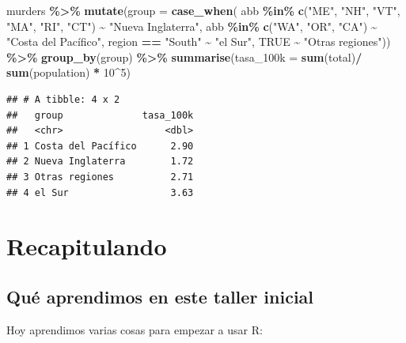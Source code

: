 \documentclass[
]{article}
\newenvironment{Shaded}{\begin{snugshade}}{\end{snugshade}}
\newcommand{\AttributeTok}[1]{\textcolor[rgb]{0.13,0.29,0.53}{#1}}
\newcommand{\ConstantTok}[1]{\textcolor[rgb]{0.56,0.35,0.01}{#1}}
\newcommand{\DecValTok}[1]{\textcolor[rgb]{0.00,0.00,0.81}{#1}}
\newcommand{\FunctionTok}[1]{\textcolor[rgb]{0.13,0.29,0.53}{\textbf{#1}}}
\newcommand{\NormalTok}[1]{#1}
\newcommand{\SpecialCharTok}[1]{\textcolor[rgb]{0.81,0.36,0.00}{\textbf{#1}}}
\newcommand{\StringTok}[1]{\textcolor[rgb]{0.31,0.60,0.02}{#1}}
\begin{document}
\begin{Shaded}
\begin{Highlighting}[]
\NormalTok{murders }\SpecialCharTok{\%\textgreater{}\%}
  \FunctionTok{mutate}\NormalTok{(}\AttributeTok{group =} \FunctionTok{case\_when}\NormalTok{(}
\NormalTok{    abb }\SpecialCharTok{\%in\%} \FunctionTok{c}\NormalTok{(}\StringTok{"ME"}\NormalTok{, }\StringTok{"NH"}\NormalTok{, }\StringTok{"VT"}\NormalTok{, }\StringTok{"MA"}\NormalTok{, }\StringTok{"RI"}\NormalTok{, }\StringTok{"CT"}\NormalTok{) }\SpecialCharTok{\textasciitilde{}} \StringTok{"Nueva Inglaterra"}\NormalTok{,}
\NormalTok{    abb }\SpecialCharTok{\%in\%} \FunctionTok{c}\NormalTok{(}\StringTok{"WA"}\NormalTok{, }\StringTok{"OR"}\NormalTok{, }\StringTok{"CA"}\NormalTok{) }\SpecialCharTok{\textasciitilde{}} \StringTok{"Costa del Pacífico"}\NormalTok{,}
\NormalTok{    region }\SpecialCharTok{==} \StringTok{"South"} \SpecialCharTok{\textasciitilde{}} \StringTok{"el Sur"}\NormalTok{,}
    \ConstantTok{TRUE} \SpecialCharTok{\textasciitilde{}} \StringTok{"Otras regiones"}\NormalTok{)) }\SpecialCharTok{\%\textgreater{}\%}
  \FunctionTok{group\_by}\NormalTok{(group) }\SpecialCharTok{\%\textgreater{}\%}
  \FunctionTok{summarise}\NormalTok{(}\AttributeTok{tasa\_100k =} \FunctionTok{sum}\NormalTok{(total)}\SpecialCharTok{/} \FunctionTok{sum}\NormalTok{(population) }\SpecialCharTok{*} \DecValTok{10}\SpecialCharTok{\^{}}\DecValTok{5}\NormalTok{)}
\end{Highlighting}
\end{Shaded}

\begin{verbatim}
## # A tibble: 4 x 2
##   group              tasa_100k
##   <chr>                  <dbl>
## 1 Costa del Pacífico      2.90
## 2 Nueva Inglaterra        1.72
## 3 Otras regiones          2.71
## 4 el Sur                  3.63
\end{verbatim}

\section{Recapitulando}\label{recapitulando}

\subsection{Qué aprendimos en este taller
inicial}\label{quuxe9-aprendimos-en-este-taller-inicial}

Hoy aprendimos varias cosas para empezar a usar R:
\end{document}
